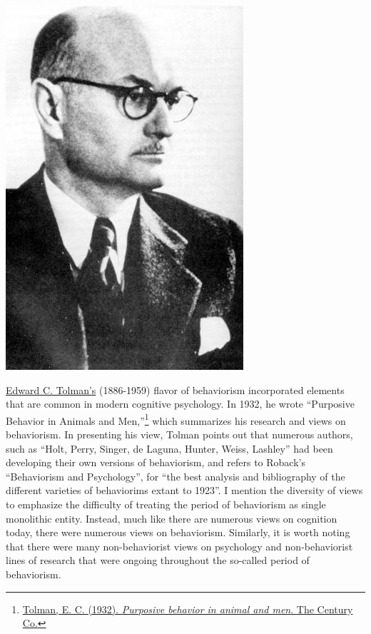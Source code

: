 \documentclass[
  oneside,
  12pt]{crumpbook}
\newenvironment{floatright25}{%
  \wrapfigure{R}{.25\textwidth}%
  }{%
  \endwrapfigure}
\begin{document}
\begin{floatright25}
\includegraphics[width=1\linewidth]{imgs/Tolman_portrait}

\end{floatright25}

\href{https://en.wikipedia.org/wiki/Edward_C._Tolman}{Edward C. Tolman's} (1886-1959) flavor of behaviorism incorporated elements that are common in modern cognitive psychology. In 1932, he wrote ``Purposive Behavior in Animals and Men,''\footnote{\protect\hyperlink{ref-tolmanPurposiveBehaviorAnimal1932}{Tolman, E. C. (1932). \emph{Purposive behavior in animal and men}. {The Century Co.}}} which summarizes his research and views on behaviorism. In presenting his view, Tolman points out that numerous authors, such as ``Holt, Perry, Singer, de Laguna, Hunter, Weiss, Lashley'' had been developing their own versions of behaviorism, and refers to Roback's ``Behaviorism and Psychology'', for ``the best analysis and bibliography of the different varieties of behaviorims extant to 1923''. I mention the diversity of views to emphasize the difficulty of treating the period of behaviorism as single monolithic entity. Instead, much like there are numerous views on cognition today, there were numerous views on behaviorism. Similarly, it is worth noting that there were many non-behaviorist views on psychology and non-behaviorist lines of research that were ongoing throughout the so-called period of behaviorism.
\end{document}
